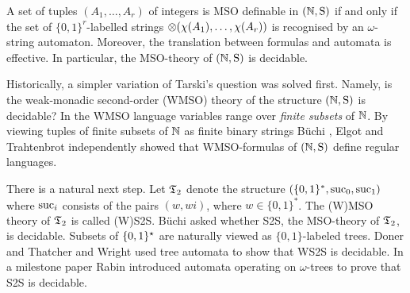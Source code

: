 \begin{theorem}
A set of tuples $(A_1,\dots,A_r)$ of integers is MSO definable in $\mbox{$(\mathbb{N},\mathrm{S})$}$ if and only if the set of $\{0,1\}^r$-labelled strings
$\otimes(\chi(A_1),\dots,\chi(A_r))$ is recognised by an $\omega$-string automaton. Moreover, the translation between formulas and automata is effective. In particular, the MSO-theory of $\mbox{$(\mathbb{N},\mathrm{S})$}$ is decidable.
\end{theorem}

Historically, a simpler variation of Tarski's question was solved first. Namely, is the weak-monadic second-order (WMSO) theory of the structure $\mbox{$(\mathbb{N},\mathrm{S})$}$ is decidable? In the WMSO language variables range over {\em finite subsets} of $\mathbb{N}$. By viewing tuples of finite subsets of $\mathbb{N}$ as finite binary strings B\"uchi \cite{Buch60}, Elgot \cite{Elgo61} and Trahtenbrot \cite{trah62} independently showed that WMSO-formulas of $\mbox{$(\mathbb{N},\mathrm{S})$}$ define regular languages. 


There is a natural next step. Let $\mathfrak{T}_2$ denote the structure $(\{0,1\}^\ast,\text{suc}_0, \text{suc}_1)$ where $\text{suc}_i$ consists of the pairs $(w,wi)$, where $w \in \{0,1\}^\ast$.  The (W)MSO theory of $\mathfrak{T}_2$ is called (W)S2S. 
B\"uchi \cite{Buch62} asked whether S2S, the MSO-theory of $\mathfrak{T}_2$, is decidable. Subsets of $\{0,1\}^\star$ are naturally viewed as $\{0,1\}$-labeled trees.
Doner \cite{Done70} and Thatcher and Wright \cite{ThWr68} used tree automata to show that WS2S is decidable. In a milestone paper Rabin \cite{Rabi69} introduced automata operating on $\omega$-trees to prove that S2S is decidable. 

